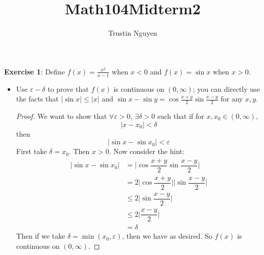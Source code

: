\documentclass{article}
\title{Math104Midterm2}
\author{Trustin Nguyen}
\begin{document}
    \maketitle

\reversemarginpar

\textbf{Exercise 1}: Define $f(x) = \frac{x^{2}}{x - 1}$ when $x < 0$ and $f(x) = \sin{x}$ when $x > 0$.
    \begin{itemize}
        \item Use $\varepsilon - \delta$ to prove that $f(x)$ is continuous on $(0, \infty)$; you can directly use the facts that $\lvert \sin{x} \rvert \leq \lvert x \rvert$ and $\sin{x} - \sin{y} = \cos{\frac{x + y}{2}}\sin{\frac{x - y}{2}}$ for any $x, y$.
            \begin{proof}
                We want to show that $\forall \varepsilon> 0$, $\exists \delta > 0$ such that if for $x, x_{0} \in (0, \infty)$,
                    \begin{equation*}
                        \lvert x - x_{0} \rvert < \delta
                    \end{equation*}
                then 
                    \begin{equation*}
                        \lvert \sin{x} - \sin{x_{0}} \rvert <  \varepsilon
                    \end{equation*}
                First take $\delta = x_{0}$. Then $x > 0$. Now consider the hint:
                    \begin{align*}
                        \lvert  \sin{x} - \sin{x_{0}} \rvert &=     \lvert \cos{\dfrac{x + y}{2}}\sin{\dfrac{x - y}{2}} \rvert                 \\
                                                             &=     2\lvert \cos{\dfrac{x + y}{2}} \rvert \lvert \sin{\dfrac{x - y}{2}} \rvert \\
                                                             &\leq  2\lvert \sin{\dfrac{x - y}{2}} \rvert                                      \\
                                                             & \leq  2\lvert \dfrac{x - y}{2} \rvert                                           \\
                                                             &=     \delta                                                                       
                    \end{align*}
                Then if we take $\delta = \min(x_{0}, \varepsilon)$, then we have as desired. So $f(x)$ is continuous on $(0, \infty)$.
            \end{proof}


\end{itemize}
\end{document}

